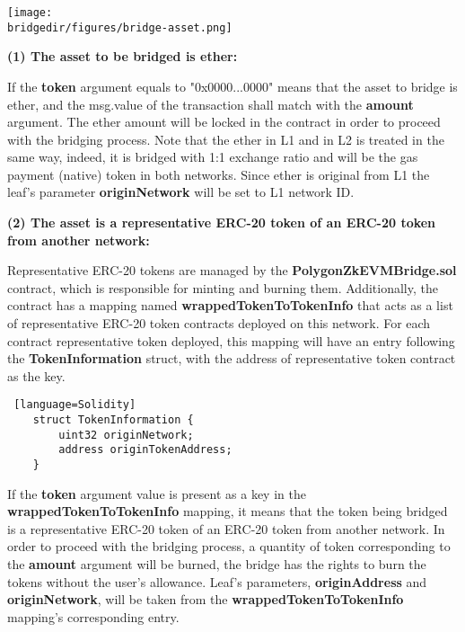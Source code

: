 \begin{center}
	\texttt{[image: \\bridgedir/figures/bridge-asset.png]}
	
	
\end{center}



\textbf{(1) The asset to be bridged is ether:}

If the \textbf{token} argument equals to "0x0000...0000" means that the asset to bridge is ether, and the msg.value of the transaction shall match with the \textbf{amount} argument. The ether amount will be locked in the contract in order to proceed with the bridging process. Note that the ether in L1 and in L2 is treated in the same way, indeed, it is bridged with 1:1 exchange ratio and will be the gas payment (native) token in both networks. Since ether is original from L1 the leaf's parameter \textbf{originNetwork} will be set to L1 network ID. 

\textbf{(2) The asset is a representative ERC-20 token of an ERC-20 token from another network:}

Representative ERC-20 tokens are managed by the \textbf{PolygonZkEVMBridge.sol} contract, which is responsible for minting and burning them. Additionally, the contract has a mapping named \textbf{wrappedTokenToTokenInfo} that acts as a list of representative ERC-20 token contracts deployed on this network. For each contract representative token deployed, this mapping will have an entry following the \textbf{TokenInformation} struct, with the address of representative token contract as the key.

\begin{lstlisting} [language=Solidity]
	struct TokenInformation {
		uint32 originNetwork;
		address originTokenAddress;
	}
\end{lstlisting}
If the \textbf{token} argument value is present as a key in the \textbf{wrappedTokenToTokenInfo} mapping, it means that the token being bridged is a representative ERC-20 token of an ERC-20 token from another network. In order to proceed with the bridging process, a quantity of  token corresponding to the \textbf{amount} argument will be burned, the bridge has the rights to burn the tokens without the user's allowance. Leaf's parameters, \textbf{originAddress} and \textbf{originNetwork}, will be taken from the \textbf{wrappedTokenToTokenInfo} mapping's corresponding entry.

